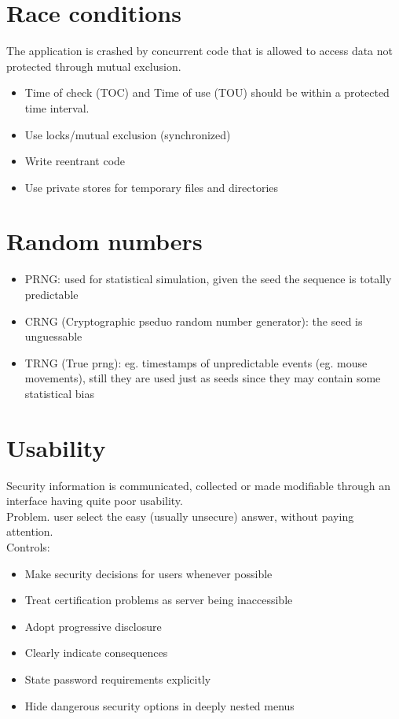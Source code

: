 \documentclass[10pt,a4paper]{article}
\begin{document}
\section{Race conditions}
The application is crashed by concurrent code that is allowed to access data not protected through mutual exclusion.
\begin{itemize}
\item Time of check (TOC) and Time of use (TOU) should be within a protected time interval.
\item Use locks/mutual exclusion (synchronized)
\item Write reentrant code
\item Use private stores for temporary files and directories
\end{itemize}
\section{Random numbers}
\begin{itemize}
\item PRNG: used for statistical simulation, given the seed the sequence is totally predictable
\item CRNG (Cryptographic pseduo random number generator): the seed is unguessable
\item TRNG (True prng): eg. timestamps of unpredictable events (eg. mouse movements), still they are used just as seeds since they may contain some statistical bias
\end{itemize}
\section{Usability}
Security information is communicated, collected or made modifiable through an interface having quite poor usability.\\
Problem. user select the easy (usually unsecure) answer, without paying attention.\\
Controls:
\begin{itemize}
\item Make security decisions for users whenever possible
\item Treat certification problems as server being inaccessible
\item Adopt progressive disclosure
\item Clearly indicate consequences
\item State password requirements explicitly
\item Hide dangerous security options in deeply nested menus
\end{itemize}
\newpage
\end{document}

